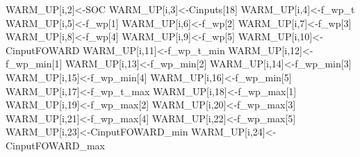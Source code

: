 \documentclass[
  10pt,
  b5paper,
]{book}
\newenvironment{Shaded}{\begin{snugshade}}{\end{snugshade}}
\newcommand{\DecValTok}[1]{\textcolor[rgb]{0.00,0.00,0.81}{#1}}
\newcommand{\NormalTok}[1]{#1}
\newcommand{\OtherTok}[1]{\textcolor[rgb]{0.56,0.35,0.01}{#1}}
\begin{document}
\begin{Shaded}
\begin{Highlighting}[]
\NormalTok{WARM\_UP[i,}\DecValTok{2}\NormalTok{]}\OtherTok{\textless{}{-}}\NormalTok{SOC}
\NormalTok{WARM\_UP[i,}\DecValTok{3}\NormalTok{]}\OtherTok{\textless{}{-}}\NormalTok{Cinputs[}\DecValTok{18}\NormalTok{]}
\NormalTok{WARM\_UP[i,}\DecValTok{4}\NormalTok{]}\OtherTok{\textless{}{-}}\NormalTok{f\_wp\_t}
\NormalTok{WARM\_UP[i,}\DecValTok{5}\NormalTok{]}\OtherTok{\textless{}{-}}\NormalTok{f\_wp[}\DecValTok{1}\NormalTok{]}
\NormalTok{WARM\_UP[i,}\DecValTok{6}\NormalTok{]}\OtherTok{\textless{}{-}}\NormalTok{f\_wp[}\DecValTok{2}\NormalTok{]}
\NormalTok{WARM\_UP[i,}\DecValTok{7}\NormalTok{]}\OtherTok{\textless{}{-}}\NormalTok{f\_wp[}\DecValTok{3}\NormalTok{]}
\NormalTok{WARM\_UP[i,}\DecValTok{8}\NormalTok{]}\OtherTok{\textless{}{-}}\NormalTok{f\_wp[}\DecValTok{4}\NormalTok{]}
\NormalTok{WARM\_UP[i,}\DecValTok{9}\NormalTok{]}\OtherTok{\textless{}{-}}\NormalTok{f\_wp[}\DecValTok{5}\NormalTok{]}
\NormalTok{WARM\_UP[i,}\DecValTok{10}\NormalTok{]}\OtherTok{\textless{}{-}}\NormalTok{CinputFOWARD}
\NormalTok{WARM\_UP[i,}\DecValTok{11}\NormalTok{]}\OtherTok{\textless{}{-}}\NormalTok{f\_wp\_t\_min}
\NormalTok{WARM\_UP[i,}\DecValTok{12}\NormalTok{]}\OtherTok{\textless{}{-}}\NormalTok{f\_wp\_min[}\DecValTok{1}\NormalTok{]}
\NormalTok{WARM\_UP[i,}\DecValTok{13}\NormalTok{]}\OtherTok{\textless{}{-}}\NormalTok{f\_wp\_min[}\DecValTok{2}\NormalTok{]}
\NormalTok{WARM\_UP[i,}\DecValTok{14}\NormalTok{]}\OtherTok{\textless{}{-}}\NormalTok{f\_wp\_min[}\DecValTok{3}\NormalTok{]}
\NormalTok{WARM\_UP[i,}\DecValTok{15}\NormalTok{]}\OtherTok{\textless{}{-}}\NormalTok{f\_wp\_min[}\DecValTok{4}\NormalTok{]}
\NormalTok{WARM\_UP[i,}\DecValTok{16}\NormalTok{]}\OtherTok{\textless{}{-}}\NormalTok{f\_wp\_min[}\DecValTok{5}\NormalTok{]}
\NormalTok{WARM\_UP[i,}\DecValTok{17}\NormalTok{]}\OtherTok{\textless{}{-}}\NormalTok{f\_wp\_t\_max}
\NormalTok{WARM\_UP[i,}\DecValTok{18}\NormalTok{]}\OtherTok{\textless{}{-}}\NormalTok{f\_wp\_max[}\DecValTok{1}\NormalTok{]}
\NormalTok{WARM\_UP[i,}\DecValTok{19}\NormalTok{]}\OtherTok{\textless{}{-}}\NormalTok{f\_wp\_max[}\DecValTok{2}\NormalTok{]}
\NormalTok{WARM\_UP[i,}\DecValTok{20}\NormalTok{]}\OtherTok{\textless{}{-}}\NormalTok{f\_wp\_max[}\DecValTok{3}\NormalTok{]}
\NormalTok{WARM\_UP[i,}\DecValTok{21}\NormalTok{]}\OtherTok{\textless{}{-}}\NormalTok{f\_wp\_max[}\DecValTok{4}\NormalTok{]}
\NormalTok{WARM\_UP[i,}\DecValTok{22}\NormalTok{]}\OtherTok{\textless{}{-}}\NormalTok{f\_wp\_max[}\DecValTok{5}\NormalTok{]}
\NormalTok{WARM\_UP[i,}\DecValTok{23}\NormalTok{]}\OtherTok{\textless{}{-}}\NormalTok{CinputFOWARD\_min}
\NormalTok{WARM\_UP[i,}\DecValTok{24}\NormalTok{]}\OtherTok{\textless{}{-}}\NormalTok{CinputFOWARD\_max}


\end{Highlighting}
\end{Shaded}
\end{document}
